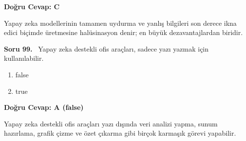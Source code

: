 \documentclass[11pt,a4paper,openany]{book}
\begin{document}
\vspace{4pt}
\begin{tcolorbox}[title=Cevap ve Açıklama, colback=gray!3!white, colframe=primarycolor!90!black, arc=2mm, fonttitle=\bfseries\sffamily, top=6pt, bottom=6pt]
    \textbf{Doğru Cevap: C}
    
    \vspace{2pt}
    Yapay zeka modellerinin tamamen uydurma ve yanlış bilgileri son derece ikna edici biçimde üretmesine halüsinasyon denir; en büyük dezavantajlardan biridir.
\end{tcolorbox}
\vspace{10pt}
\needspace{5cm}
\vspace{8pt}
\noindent\textbf{\large\sffamily Soru 99.} \ Yapay zeka destekli ofis araçları, sadece yazı yazmak için kullanılabilir.

\begin{enumerate}[label=\Alph*), leftmargin=25pt, topsep=4pt, itemsep=2pt]
        \item false
        \item true
\end{enumerate}

\vspace{4pt}
\begin{tcolorbox}[title=Cevap ve Açıklama, colback=gray!3!white, colframe=primarycolor!90!black, arc=2mm, fonttitle=\bfseries\sffamily, top=6pt, bottom=6pt]
    \textbf{Doğru Cevap: A (false)}
    
    \vspace{2pt}
    Yapay zeka destekli ofis araçları yazı dışında veri analizi yapma, sunum hazırlama, grafik çizme ve özet çıkarma gibi birçok karmaşık görevi yapabilir.
\end{tcolorbox}
\vspace{10pt}
\end{document}
